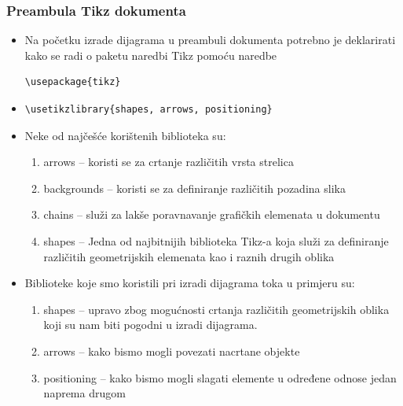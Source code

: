 \documentclass{beamer}
\begin{document}
\begin{frame}[fragile]
	\frametitle{Preambula Tikz dokumenta}
		\begin{itemize}
		\item  Na početku izrade dijagrama u preambuli dokumenta potrebno je deklarirati kako se radi o paketu naredbi Tikz pomoću naredbe\begin{verbatim}\usepackage{tikz}\end{verbatim}
		\item \begin{verbatim}\usetikzlibrary{shapes, arrows, positioning}\end{verbatim}
		\item Neke od najčešće korištenih biblioteka su:
			\begin{enumerate}
				\item arrows – koristi se za crtanje različitih vrsta strelica
				\item backgrounds – koristi se za definiranje različitih pozadina slika
				\item chains – služi za lakše poravnavanje grafičkih elemenata u dokumentu
				\item shapes – Jedna od najbitnijih biblioteka Tikz-a koja služi za definiranje različitih geometrijskih elemenata kao i raznih drugih oblika 
			\end{enumerate}
		\item Biblioteke koje smo koristili pri izradi dijagrama toka u primjeru su:
			\begin{enumerate}
				\item shapes – upravo zbog mogućnosti crtanja različitih geometrijskih oblika koji su nam biti pogodni u izradi dijagrama.
				\item arrows – kako bismo mogli povezati nacrtane objekte
				\item positioning – kako bismo mogli slagati elemente u određene odnose jedan naprema drugom 
			\end{enumerate}
  		\end{itemize}	
\end{frame}
\end{document}
